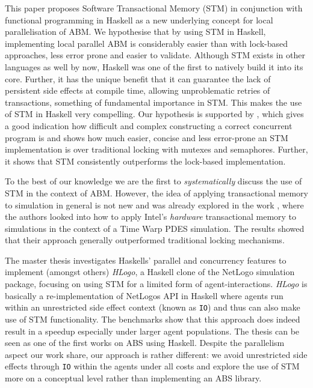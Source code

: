This paper proposes Software Transactional Memory (STM) in conjunction with functional programming in Haskell \cite{hudak_history_2007} as a new underlying concept for local parallelisation of ABM. We hypothesise that by using STM in Haskell, implementing local parallel ABM is considerably easier than with lock-based approaches, less error prone and easier to validate. Although STM exists in other languages as well by now, Haskell was one of the first to natively build it into its core. Further, it has the unique benefit that it can guarantee the lack of persistent side effects at compile time, allowing unproblematic retries of transactions, something of fundamental importance in STM. This makes the use of STM in Haskell very compelling. 
Our hypothesis is supported by \cite{discolo_lock_2006}, which gives a good indication how difficult and complex constructing a correct concurrent program is and shows how much easier, concise and less error-prone an STM implementation is over traditional locking with mutexes and semaphores. Further, it shows that STM consistently outperforms the lock-based implementation.


\medskip

To the best of our knowledge we are the first to \textit{systematically} discuss the use of STM in the context of ABM. However, the idea of applying transactional memory to simulation in general is not new and was already explored in the work \cite{hay_experiments_2015}, where the authors looked into how to apply Intel’s \textit{hardware} transactional memory to simulations in the context of a Time Warp PDES simulation. The results showed that their approach generally outperformed traditional locking mechanisms.

The master thesis \cite{bezirgiannis_improving_2013} investigates Haskells' parallel and concurrency features to implement (amongst others) \textit{HLogo}, a Haskell clone of the NetLogo \cite{wilensky_introduction_2015} simulation package, focusing on using STM for a limited form of agent-interactions. \textit{HLogo} is basically a re-implementation of NetLogos API in Haskell where agents run within an unrestricted side effect context (known as \texttt{IO}) and thus can also make use of STM functionality. The benchmarks show that this approach does indeed result in a speedup especially under larger agent populations. The thesis can be seen as one of the first works on ABS using Haskell. Despite the parallelism aspect our work share, our approach is rather different: we avoid unrestricted side effects through \texttt{IO} within the agents under all costs and explore the use of STM more on a conceptual level rather than implementing an ABS library.


